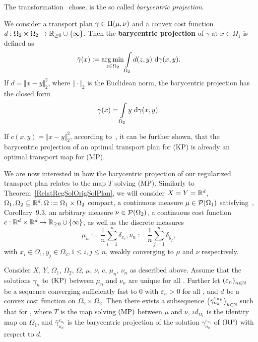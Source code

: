 The transformation~\cite{Seg2018} chose, is the so called \textit{barycentric projection}.

\begin{definition}\label{BarCentrProj}
	We consider a transport plan $\gamma \in \TP{\mu}{\nu}$ and a convex cost function $\map[d]{\Omega_2 \times \Omega_2}{\RZero \cup \{ \infty \}}$. Then the \textbf{barycentric projection} of $\gamma$ at $x \in \Omega_1$ is defined as
	\[ \bar{\gamma}(x) := \argmin\limits_{z \in \Omega_2} \int\limits_{\Omega_2} d(z, y)~\Dx[x, y]{\gamma}. \]
	If $d = \Vert x - y \Vert_2^2$, where $\Vert \cdot \Vert_2$ is the Euclidean norm, the barycentric projection has the closed form
	\[ \bar{\gamma}(x) = \int\limits_{\Omega_2} y~\Dx[x, y]{\gamma}. \]
\end{definition}

If $c(x, y) = \Vert x - y \Vert_2^2$, according to~\cite{Seg2018}, it can be further shown, that the barycentric projection of an optimal transport plan for (KP) is already an optimal transport map for (MP).

We are now interested in how the barycentric projection of our regularized transport plan relates to the map $T$ solving (MP). Similarly to Theorem~\ref{RelatRegSolOrigSolPlan}, we will consider $X = Y = \R^d$, $\Omega_1, \Omega_2 \subseteq \R^d, \Omega := \Omega_1 \times \Omega_2$ compact, a continuous measure $\mu \in \PM{\Omega_1}$ satisfying~\cite{Vill2009}, Corollary~9.3, an arbitrary measure $\nu \in \PM{\Omega_2}$, a continuous cost function $\map[c]{\R^d \times \R^d}{\RZero \cup \{ \infty \}}$, as well as the discrete measures
\[ \mu_n := \frac{1}{n} \sum\limits_{i = 1}^n \delta_{x_i}, \nu_n := \frac{1}{n} \sum\limits_{j = 1}^n \delta_{y_j}, \]
with $x_i \in \Omega_1, y_j \in \Omega_2, 1 \le i, j \le n$, weakly converging to $\mu$ and $\nu$ respectively.

\begin{theorem}\label{RelatRegSolOrigSolMap}
	Consider $X$, $Y$, $\Omega_1$, $\Omega_2$, $\Omega$, $\mu$, $\nu$, $c$, $\mu_n$, $\nu_n$ as described above. Assume that the solutions $\gamma_n$ to$\text{\normalfont\ (KP)}$ between $\mu_n$ and $\nu_n$ are unique for all \NinN. Further let ${(\varepsilon_n)}_{\NinN}$ be a sequence converging sufficiently fast to $0$ with $\varepsilon_n > 0$ for all \NinN, and $d$ be a convex cost function on $\Omega_2 \times \Omega_2$. Then there exists a subsequence ${\big(\bar{\gamma}^{\varepsilon_{n_k}}_{n_k}\big)}_{\NinN[k]}$ such that  for \Ninf, where $T$ is the map solving$\text{\normalfont\ (MP)}$ between $\mu$ and $\nu$, $id_{\Omega_1}$ is the identity map on $\Omega_1$, and $\bar{\gamma}^{\varepsilon_{n_k}}_{n_k}$ is the barycentric projection of the solution $\gamma^{\varepsilon_{n_k}}_{n_k}$ of$\text{\normalfont\ (RP)}$ with respect to $d$.
\end{theorem}

